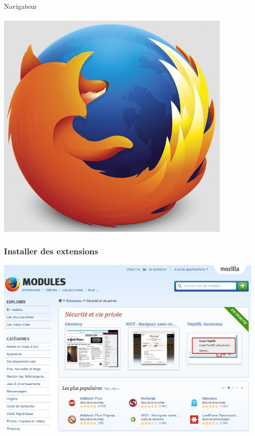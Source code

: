 \documentclass{beamer}
\begin{document}
\begin{frame}
\begin{center}
\Huge{Navigateur}\\~\\
\includegraphics[scale=0.3] {./images/firefox.jpg}
\end{center}
\end{frame}

\begin{frame}
\frametitle{Installer des extensions}
\begin{center}
\includegraphics[scale=0.75] {./images/extensions_firefox.jpg}
\end{center}
\end{frame}
\end{document}
